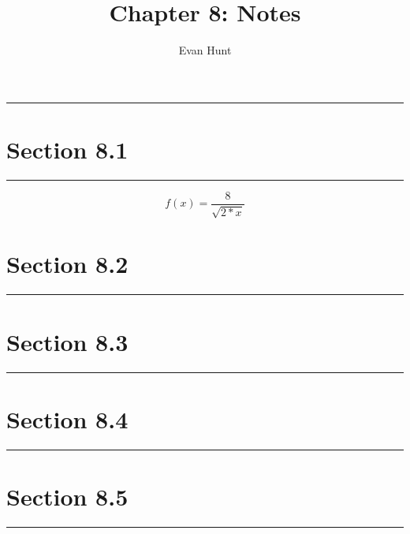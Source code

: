 \documentclass[12pt]{article}
\title{Chapter 8: Notes}
\author{Evan Hunt}
\begin{document}
    \maketitle

    \noindent\rule{\textwidth}{0.4pt}
    \section[]{Section 8.1}
    \noindent\rule{\textwidth}{0.4pt}
        \begin{equation}
            f(x) = \frac{8}{\sqrt{2*x}}
        \end{equation}
    \section[]{Section 8.2}
    \noindent\rule{\textwidth}{0.4pt}
    \section[]{Section 8.3}
    \noindent\rule{\textwidth}{0.4pt}
    \section[]{Section 8.4}
    \noindent\rule{\textwidth}{0.4pt}
    \section[]{Section 8.5}
    \noindent\rule{\textwidth}{0.4pt}
\end{document}
